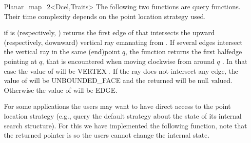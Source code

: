 \begin{ccRefClass}{Planar_map_2<Dcel,Traits>}
The following two functions are query functions. Their time complexity
depends on the point location strategy used.

    
 {if
    is  (respectively,
   ) returns the first edge of  that
   intersects the upward (respectively, downward) vertical ray emanating
   from . If several edges intersect the vertical ray
   in the same (end)point $q$, the function returns the
   first halfedge pointing at $q$, that is encountered when moving clockwise 
   from  around $q$ . 
   In that case the value of  will
   be VERTEX . If the ray does not intersect any edge, the value 
   of  
   will be UNBOUNDED\_FACE and the 
   returned will be null
   valued. Otherwise the value of  will be EDGE.
    } 

\begin{ccAdvanced}
    For some applications the users may want to have direct access to
    the point location strategy (e.g., query the default strategy about
    the state of its internal search structure). For this we have implemented 
    the following function, note that the returned pointer is  so
    the users cannot change the internal state.


\end{ccAdvanced}
\end{ccRefClass}
